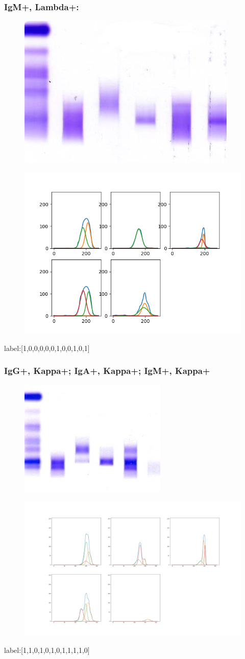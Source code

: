 \documentclass[12pt]{ctexart}
\begin{document}
\subsubsection{IgM+, Lambda+:}
\begin{figure}[H]
    \centering
    \includegraphics[width=0.5\linewidth]{f1.jpg}
\end{figure}
\begin{figure}[H]
    \centering
    \includegraphics[width=0.8\linewidth]{f.png}
\end{figure}
label:[1,0,0,0,0,0,1,0,0,1,0,1]
\subsubsection{IgG+, Kappa+; IgA+, Kappa+; IgM+, Kappa+}
\begin{figure}[H]
    \centering
    \includegraphics[width=0.5\linewidth]{l1.jpg}
\end{figure}
\begin{figure}[H]
    \centering
    \includegraphics[width=0.8\linewidth]{l.png}
\end{figure}
label:[1,1,0,1,0,1,0,1,1,1,1,0]
\end{document}

